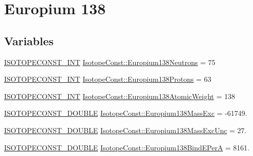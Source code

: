 \hypertarget{group___isotope_const-_europium-_eu138}{}\section{Europium 138}
\label{group___isotope_const-_europium-_eu138}
\subsection*{Variables}
\begin{DoxyCompactItemize}
\item 
\mbox{\hyperlink{group___isotope_const-_macros_ga5f18360b3e99483a35c32d789e62621c}{I\+S\+O\+T\+O\+P\+E\+C\+O\+N\+S\+T\+\_\+\+I\+NT}} \mbox{\hyperlink{group___isotope_const-_europium-_eu138_gaa54f2dc4406bf5a25dff57091204a00f}{Isotope\+Const\+::\+Europium138\+Neutrons}} = 75
\item 
\mbox{\hyperlink{group___isotope_const-_macros_ga5f18360b3e99483a35c32d789e62621c}{I\+S\+O\+T\+O\+P\+E\+C\+O\+N\+S\+T\+\_\+\+I\+NT}} \mbox{\hyperlink{group___isotope_const-_europium-_eu138_ga8c6fe5e9dc53e72ab096e6acd8fadb21}{Isotope\+Const\+::\+Europium138\+Protons}} = 63
\item 
\mbox{\hyperlink{group___isotope_const-_macros_ga5f18360b3e99483a35c32d789e62621c}{I\+S\+O\+T\+O\+P\+E\+C\+O\+N\+S\+T\+\_\+\+I\+NT}} \mbox{\hyperlink{group___isotope_const-_europium-_eu138_ga22f280d0ad2356e252e6a94bbd6aecdf}{Isotope\+Const\+::\+Europium138\+Atomic\+Weight}} = 138
\item 
\mbox{\hyperlink{group___isotope_const-_macros_ga8f45a7272ce02c0b4c65c44636ed719a}{I\+S\+O\+T\+O\+P\+E\+C\+O\+N\+S\+T\+\_\+\+D\+O\+U\+B\+LE}} \mbox{\hyperlink{group___isotope_const-_europium-_eu138_ga3e7e1759a38e0c6c7fadb81d2b35d40e}{Isotope\+Const\+::\+Europium138\+Mass\+Exc}} = -\/61749.
\item 
\mbox{\hyperlink{group___isotope_const-_macros_ga8f45a7272ce02c0b4c65c44636ed719a}{I\+S\+O\+T\+O\+P\+E\+C\+O\+N\+S\+T\+\_\+\+D\+O\+U\+B\+LE}} \mbox{\hyperlink{group___isotope_const-_europium-_eu138_gae95368a547299f549a51513acc6f59df}{Isotope\+Const\+::\+Europium138\+Mass\+Exc\+Unc}} = 27.
\item 
\mbox{\hyperlink{group___isotope_const-_macros_ga8f45a7272ce02c0b4c65c44636ed719a}{I\+S\+O\+T\+O\+P\+E\+C\+O\+N\+S\+T\+\_\+\+D\+O\+U\+B\+LE}} \mbox{\hyperlink{group___isotope_const-_europium-_eu138_ga4b2cd708999bb5f469da507dfcba7725}{Isotope\+Const\+::\+Europium138\+Bind\+E\+PerA}} = 8161.
\item 

\end{DoxyCompactItemize}

